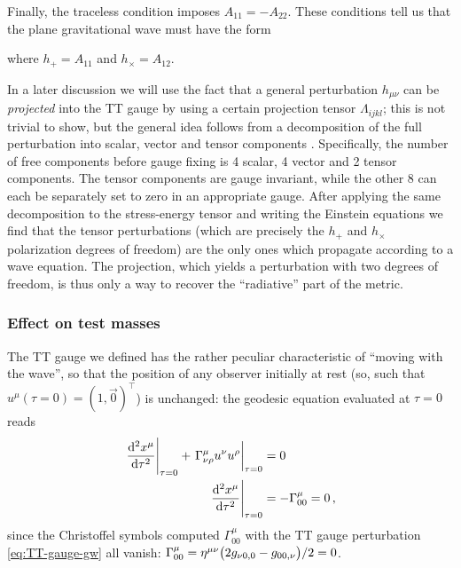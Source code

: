 \documentclass[main.tex]{subfiles}
\begin{document}
Finally, the traceless condition imposes \(A_{11} = - A_{22} \).
These conditions tell us that the plane gravitational wave must have the form 
%

%
%
where \(h_+ = A_{11} \) and \(h_\times = A_{12} \). 

In a later discussion we will use the fact that a general perturbation \(h_{\mu \nu }\) can be \emph{projected} into the \ac{TT} gauge by using a certain projection tensor \(\Lambda_{ijkl}\); this is not trivial to show, but the general idea follows from a decomposition of the full perturbation into scalar, vector and tensor components \cite[]{carrollSpacetimeGeometryIntroduction2019}.
Specifically, the number of free components before gauge fixing is 4 scalar, 4 vector and 2 tensor components. 
The tensor components are gauge invariant, while the other 8 can each be separately set to zero in an appropriate gauge.
After applying the same decomposition to the stress-energy tensor and writing the Einstein equations we find that the tensor perturbations (which are precisely the \(h_{+}\) and \(h_{ \times }\) polarization degrees of freedom) are the only ones which propagate according to a wave equation. 
The projection, which yields a perturbation with two degrees of freedom, is thus only a way to recover the ``radiative'' part of the metric. 

\subsubsection{Effect on test masses}

The \ac{TT} gauge we defined has the rather peculiar characteristic of ``moving with the wave'', so that the position of any observer initially at rest (so, such that \(u^{\mu } (\tau = 0 ) = (1, \vec{0})^{\top}\)) is unchanged: the geodesic equation evaluated at \(\tau = 0\) reads
%
\begin{align}
\eval{\dv[2]{x^{\mu }}{\tau}}_{\tau = 0} + \eval{\Gamma^{\mu }_{\nu \rho } u^{\nu } u^{\rho }}_{\tau = 0} &= 0   \\
\eval{\dv[2]{x^{\mu }}{\tau}}_{\tau = 0} &= - \Gamma^{\mu }_{00} = 0 
\,,
\end{align}
%
since the Christoffel symbols computed \(\Gamma^{\mu }_{00}\) with the \ac{TT} gauge perturbation \eqref{eq:TT-gauge-gw} all vanish: \(\Gamma^{\mu }_{00} = \eta^{\mu \nu } \qty( 2 g_{\nu 0,0} - g_{00, \nu }) / 2 =  0\).
\end{document}
